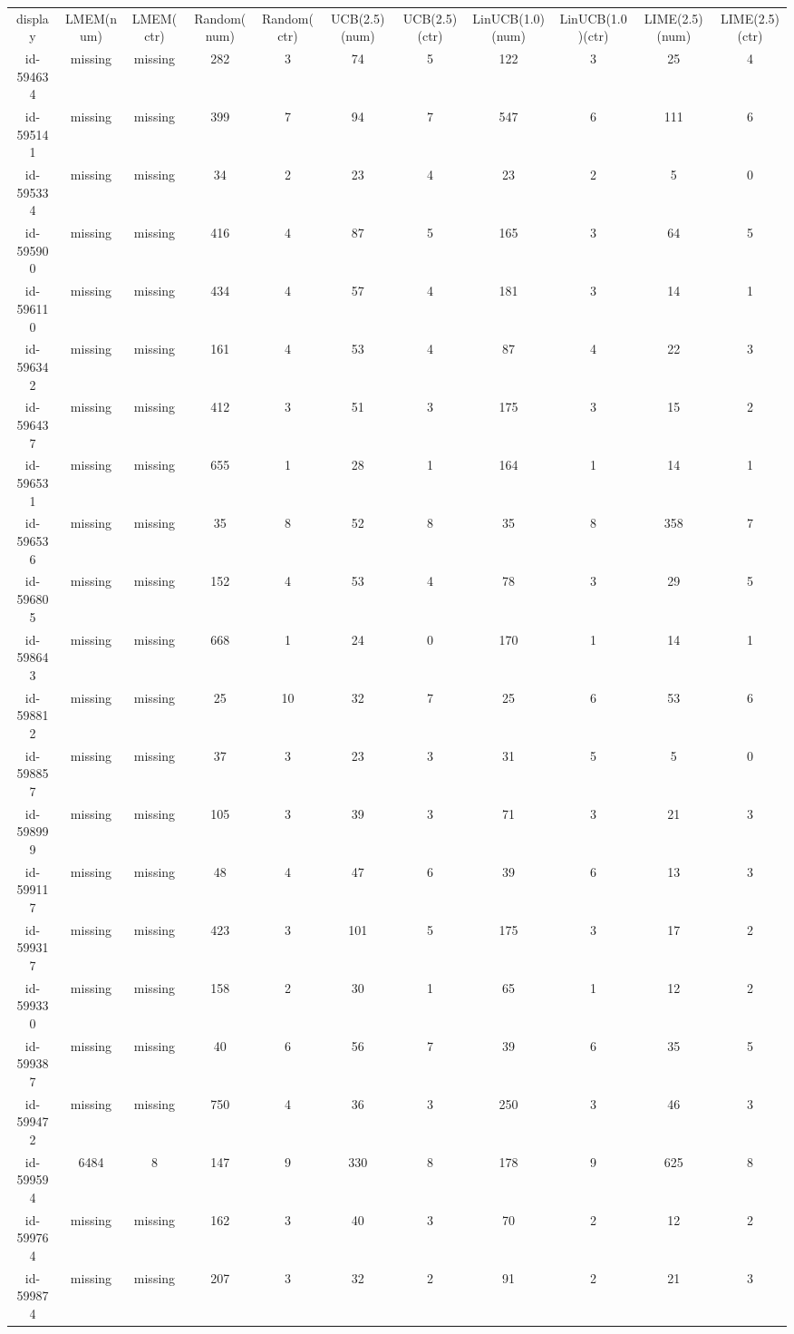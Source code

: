\begin{tabular}{ccccccccccc}
display & LMEM(num) & LMEM(ctr) & Random(num) & Random(ctr) & UCB(2.5)(num) & UCB(2.5)(ctr) & LinUCB(1.0)(num) & LinUCB(1.0)(ctr) & LIME(2.5)(num) & LIME(2.5)(ctr)\\
id-594634 & missing & missing & 282 & 3 & 74 & 5 & 122 & 3 & 25 & 4\\
id-595141 & missing & missing & 399 & 7 & 94 & 7 & 547 & 6 & 111 & 6\\
id-595334 & missing & missing & 34 & 2 & 23 & 4 & 23 & 2 & 5 & 0\\
id-595900 & missing & missing & 416 & 4 & 87 & 5 & 165 & 3 & 64 & 5\\
id-596110 & missing & missing & 434 & 4 & 57 & 4 & 181 & 3 & 14 & 1\\
id-596342 & missing & missing & 161 & 4 & 53 & 4 & 87 & 4 & 22 & 3\\
id-596437 & missing & missing & 412 & 3 & 51 & 3 & 175 & 3 & 15 & 2\\
id-596531 & missing & missing & 655 & 1 & 28 & 1 & 164 & 1 & 14 & 1\\
id-596536 & missing & missing & 35 & 8 & 52 & 8 & 35 & 8 & 358 & 7\\
id-596805 & missing & missing & 152 & 4 & 53 & 4 & 78 & 3 & 29 & 5\\
id-598643 & missing & missing & 668 & 1 & 24 & 0 & 170 & 1 & 14 & 1\\
id-598812 & missing & missing & 25 & 10 & 32 & 7 & 25 & 6 & 53 & 6\\
id-598857 & missing & missing & 37 & 3 & 23 & 3 & 31 & 5 & 5 & 0\\
id-598999 & missing & missing & 105 & 3 & 39 & 3 & 71 & 3 & 21 & 3\\
id-599117 & missing & missing & 48 & 4 & 47 & 6 & 39 & 6 & 13 & 3\\
id-599317 & missing & missing & 423 & 3 & 101 & 5 & 175 & 3 & 17 & 2\\
id-599330 & missing & missing & 158 & 2 & 30 & 1 & 65 & 1 & 12 & 2\\
id-599387 & missing & missing & 40 & 6 & 56 & 7 & 39 & 6 & 35 & 5\\
id-599472 & missing & missing & 750 & 4 & 36 & 3 & 250 & 3 & 46 & 3\\
id-599594 & 6484 & 8 & 147 & 9 & 330 & 8 & 178 & 9 & 625 & 8\\
id-599764 & missing & missing & 162 & 3 & 40 & 3 & 70 & 2 & 12 & 2\\
id-599874 & missing & missing & 207 & 3 & 32 & 2 & 91 & 2 & 21 & 3\\

\end{tabular}
